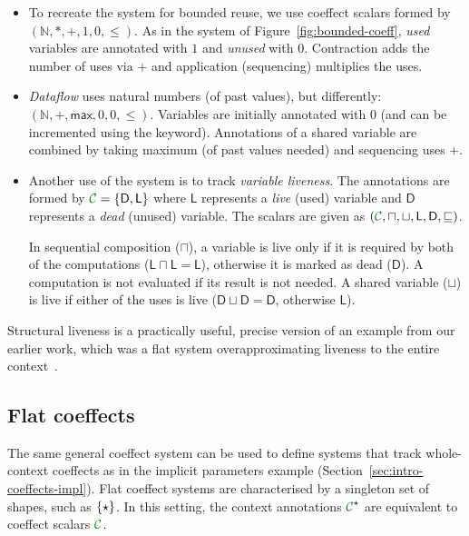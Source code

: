 \begin{itemize}
\item
To recreate the system for bounded reuse, we use coeffect scalars formed by
$(\mathbb{N}, \ast, +, 1, 0, \leq)$. As in the system of Figure~\ref{fig:bounded-coeff},
\emph{used} variables are annotated with $1$ and \emph{unused} with $0$. Contraction adds the number
of uses via $+$ and application (sequencing) multiplies the uses.

\item
\emph{Dataflow} uses natural numbers (of past values), but differently: $(\mathbb{N}, +, \mathsf{max}, 0, 0, \leq)$.
Variables are initially annotated with $0$ (and can be incremented using the  keyword).
Annotations of a shared variable are combined by taking maximum (of past values needed) and
sequencing uses $+$.

\item
Another use of the system is to track \emph{variable liveness}. The annotations are formed by
$\C=\{ \mathsf{D}, \mathsf{L} \}$ where $\mathsf{L}$ represents a \emph{live} (used) variable
and $\mathsf{D}$ represents a \emph{dead} (unused) variable. The scalars are given as
$(\C, \sqcap, \sqcup, \mathsf{L}, \mathsf{D}, \sqsubseteq)$. 

In sequential composition ($\sqcap$), a variable is live only if it is required by both of the 
computations ($\mathsf{L} \sqcap \mathsf{L} = \mathsf{L}$), otherwise it is marked as 
dead ($\mathsf{D}$). A computation is not evaluated if its result is not needed.
A shared variable ($\sqcup$) is live if either of the uses is live 
($\mathsf{D} \sqcup \mathsf{D} = \mathsf{D}$, otherwise $\mathsf{L}$).
\end{itemize}

\noindent
Structural liveness is a practically useful, precise version of an example from our earlier
work, which was a flat system overapproximating liveness to the entire
context~\cite{petricek2013coeffects}.


\subsection{Flat coeffects}
\label{sec:unified-flat}

The same general coeffect system can be used to define systems that track whole-context coeffects
as in the implicit parameters example 
(Section~\ref{sec:intro-coeffects-impl}). Flat coeffect systems are
characterised by a singleton set of shapes, such as ${ \{ \star \} }$. In
this setting, the context annotations $\C^{ \sflat }$ are
equivalent to coeffect scalars $\C$.

